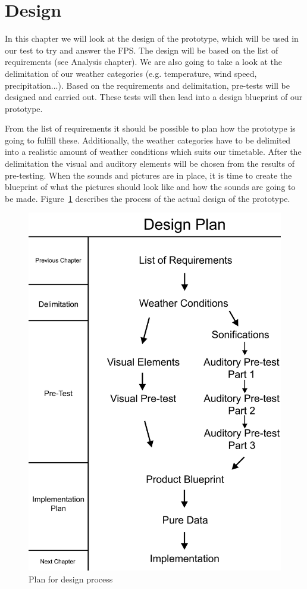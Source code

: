 
\section{Design} %
\label{sec:design}

In this chapter we will look at the design of the prototype, which will be used in our test to try and answer the FPS. 
The design will be based on the list of requirements (see Analysis chapter). 
We are also going to take a look at the delimitation of our weather categories (e.g. temperature, wind speed, precipitation...). 
Based on the requirements and delimitation, pre-tests will be designed and carried out. 
These tests will then lead into a design blueprint of our prototype.

From the list of requirements it should be possible to plan how the prototype is going to fulfill these. 
Additionally, the weather categories have to be delimited into a realistic amount of weather conditions which suits our timetable. 
After the delimitation the visual and auditory elements will be chosen from the results of pre-testing. 
When the sounds and pictures are in place, it is time to create the blueprint of what the pictures should look like and how the sounds are going to be made. 
Figure~\ref{fig:design1} describes the process of the actual design of the prototype.

\begin{figure}[!htbp]
    \centering
    \includegraphics[width=.5\textwidth]{images/Design1.jpg}
    \caption{Plan for design process}
    \label{fig:design1}
\end{figure}


